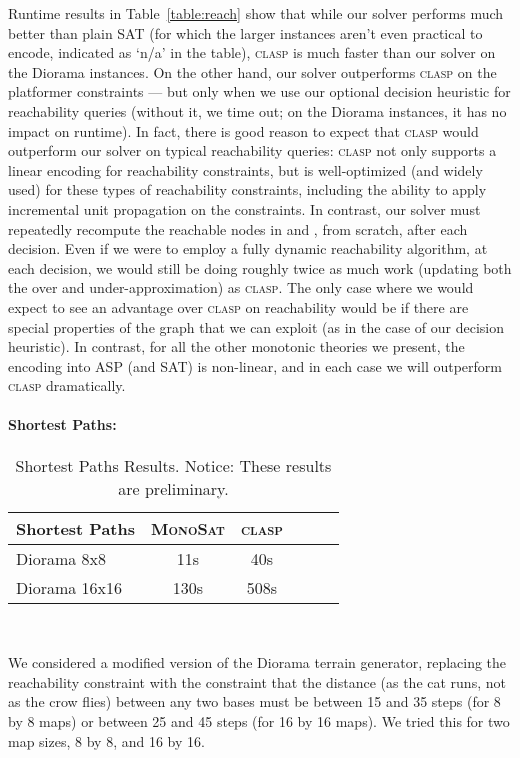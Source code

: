 \documentclass[runningheads]{llncs}
\newcommand{\comments}[1]{}
\newcommand{\algformat}[1]{\textsc{#1}\xspace}
\newcommand{\monosat}{\algformat{MonoSat}}
\newcommand{\clasp}{\algformat{clasp}}
\begin{document}
Runtime results in 
Table~\ref{table:reach} show that while our solver performs
much better than plain SAT (for which the larger instances aren't
even practical to encode, indicated as `n/a' in the table),  \clasp is much faster than our solver on the
Diorama instances. On the other hand, our solver outperforms \clasp on
the platformer constraints --- but only when we use our optional decision
heuristic for reachability queries (without it, we time out; on the
Diorama instances, it has no impact on runtime). In fact, there is good
reason to expect that \clasp would outperform our solver on typical
reachability queries:  \clasp not only supports a linear encoding
for reachability constraints,
but is well-optimized (and widely used) for these types of reachability
constraints, including the ability
to apply incremental
unit propagation on the constraints. In contrast, our solver must
repeatedly recompute the reachable nodes in  and , from
scratch, after each decision. Even if we were to employ a fully dynamic
reachability algorithm, at each decision, we would still be doing roughly twice as much work
(updating both the over and under-approximation)  as
\clasp{}. The only case where we would expect to see an advantage
over \clasp on reachability would be if there are special properties
of the graph  that we can exploit (as
in the case of our decision heuristic).
In contrast, for all the other monotonic theories we present,
the encoding into ASP (and SAT) is non-linear, and in each case we will outperform \clasp dramatically. 


\paragraph{\textbf{Shortest Paths:}}

\begin{wraptable}{R}{0.45\textwidth}

\centering
\begin{tabular}{ l c c c c c }
  Shortest Paths & \monosat &  \clasp  \\
  \hline
Diorama 8x8 & 11s & 40s  \\ Diorama 16x16 &  130s   &  508s \\ \hline  
\end{tabular}~~~~
\caption{Shortest Paths Results. \label{table:shortest}Notice: These results are preliminary.}\end{wraptable}

We considered a modified version of the Diorama terrain generator, replacing the reachability constraint with the constraint that the distance (as the cat runs, not as the crow flies) between any two bases must be between 15 and 35 steps (for 8 by 8 maps) or between 25 and 45 steps (for 16 by 16 maps). We tried this for two map sizes, 8 by 8, and 16 by 16. 
\comments{
Our second application is the chromatic maze generation problem from~\cite{smith2011answer}. This task involves assigning colors to a grid to form a `chromatic' maze, with a minimum start-to-finish path length of a certain size (for the 6x6 maze, the path must be at least 20 steps; for the 10x10 maze, at least 65 steps). 
}
\end{document}
